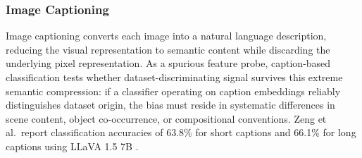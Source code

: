 \begin{table}[ht]
	\centering
	\footnotesize
	\caption{Label remapping configurations applied during object detection.}
	\label{tab:label_remap}
\end{table}

\subsubsection{Image Captioning}
\label{subsec:captioning}

Image captioning converts each image into a natural language description, reducing the visual representation to semantic content while discarding the underlying pixel representation. As a spurious feature probe, caption-based classification tests whether dataset-discriminating signal survives this extreme semantic compression: if a classifier operating on caption embeddings reliably distinguishes dataset origin, the bias must reside in systematic differences in scene content, object co-occurrence, or compositional conventions. Zeng et al.\ report classification accuracies of 63.8\% for short captions and 66.1\% for long captions using LLaVA 1.5 7B \cite{Liu_2023_LLaVA}.

